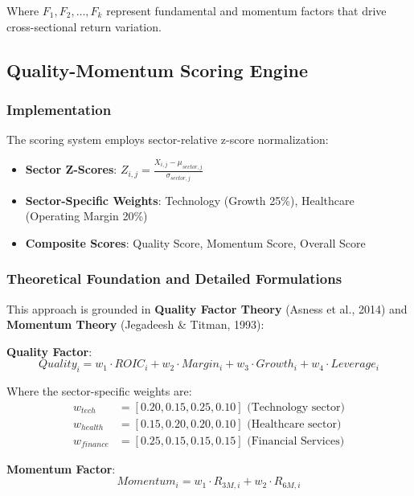 \documentclass[12pt,a4paper]{article}
\begin{document}
Where $F_1, F_2, \ldots, F_k$ represent fundamental and momentum factors that drive cross-sectional return variation.

\subsection{Quality-Momentum Scoring Engine}

\subsubsection{Implementation}
The scoring system employs sector-relative z-score normalization:

\begin{itemize}
    \item \textbf{Sector Z-Scores}: $Z_{i,j} = \frac{X_{i,j} - \mu_{sector,j}}{\sigma_{sector,j}}$
    \item \textbf{Sector-Specific Weights}: Technology (Growth 25\%), Healthcare (Operating Margin 20\%)
    \item \textbf{Composite Scores}: Quality Score, Momentum Score, Overall Score
\end{itemize}

\subsubsection{Theoretical Foundation and Detailed Formulations}
This approach is grounded in \textbf{Quality Factor Theory} (Asness et al., 2014) and \textbf{Momentum Theory} (Jegadeesh \& Titman, 1993):

\textbf{Quality Factor}:
\begin{equation}
Quality_i = w_1 \cdot ROIC_i + w_2 \cdot Margin_i + w_3 \cdot Growth_i + w_4 \cdot Leverage_i
\end{equation}

Where the sector-specific weights are:
\begin{align}
w_{tech} &= [0.20, 0.15, 0.25, 0.10] \text{ (Technology sector)} \\
w_{health} &= [0.15, 0.20, 0.20, 0.10] \text{ (Healthcare sector)} \\
w_{finance} &= [0.25, 0.15, 0.15, 0.15] \text{ (Financial Services)}
\end{align}

\textbf{Momentum Factor}:
\begin{equation}
Momentum_i = w_1 \cdot R_{3M,i} + w_2 \cdot R_{6M,i}
\end{equation}
\end{document}
